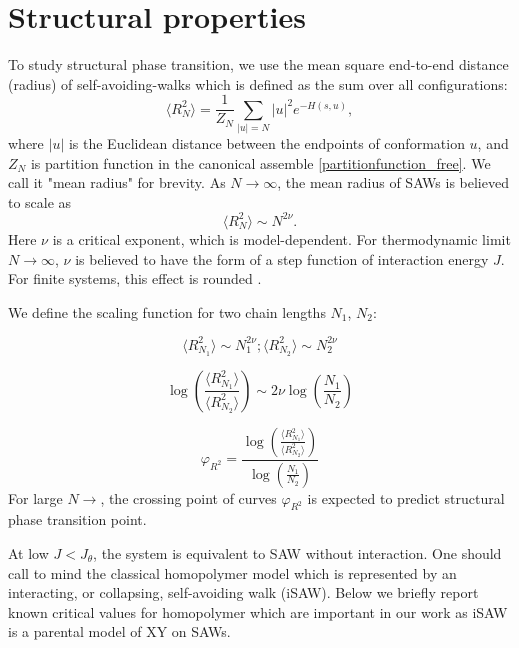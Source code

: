 \section{Structural properties} 
To study structural phase transition, we use the mean square end-to-end distance (radius) of self-avoiding-walks which is defined as the sum over all configurations:
\begin{equation}
\label{endtoend}
\langle R_N^2 \rangle  =  \frac{1}{Z_N} \sum_{ |u|=N }  |u|^2 e^{-H(s,u)},
\end{equation}
where $|u|$ is the Euclidean distance between the endpoints of conformation $u$, and $Z_N$ is partition function in the canonical assemble \eqref{partitionfunction_free}. We call it "mean radius" for brevity. As $N \rightarrow \infty $, the mean radius  of SAWs is believed to scale as 
\begin{equation}
\label{r_scale}
\langle R_N^2 \rangle \sim N^{2 \nu }.
\end{equation}
Here ${\nu} $ is a critical exponent, which is model-dependent.   For thermodynamic limit $N \rightarrow \infty $, $\nu$ is believed to have the form of a step function of interaction energy $J$. For finite systems, this effect is rounded \cite{vanderzande1998lattice}. 

We define the scaling function for two chain lengths $N_1$, $N_2$:

\begin{equation*}
\label{r1r2}
\langle R_{N_1}^2 \rangle \sim N_1^{2 \nu }; \langle R_{N_2}^2 \rangle \sim N_2^{2 \nu }
\end{equation*}

\begin{equation*}
\label{logr1r2}
\log  \left(  \frac{ \langle R_{N_1}^2 \rangle}  {\langle R_{N_2}^2 \rangle}  \right) \sim  2\nu \log  \left(  \frac{ N_1}  {N_2}  \right)
\end{equation*}

\begin{equation}
\label{varphir}
 \varphi_{R^2} =  \frac{   \log  \left(  \frac{ \langle R_{N_1}^2 \rangle}  {\langle R_{N_2}^2 \rangle}  \right) }{ \log  \left(  \frac{ N_1}  {N_2}  \right) }
\end{equation}
For large $N \rightarrow$, the crossing point of curves $\varphi_{R^2}$ is expected to predict structural phase transition point. 

At low $J < J_{\theta}$, the system is equivalent to SAW without interaction. One should call to mind the classical homopolymer model which is represented by an interacting, or collapsing, self-avoiding walk (iSAW). Below we briefly report known critical values for homopolymer which are important in our work as iSAW is a parental model of XY on SAWs. 


